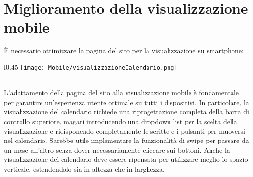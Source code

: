 \section{Miglioramento della visualizzazione mobile}
È necessario ottimizzare la pagina del sito per la visualizzazione su smartphone:
\begin{wrapfigure}{l}{0.45\textwidth}
    \centering
    \texttt{[image: Mobile/visualizzazioneCalendario.png]} 
\end{wrapfigure}
\\
L'adattamento della pagina del sito alla visualizzazione mobile è fondamentale per garantire un'esperienza 
utente ottimale su tutti i dispositivi. In particolare, la visualizzazione del calendario richiede una 
riprogettazione completa della barra di controllo superiore, magari introducendo una dropdown list per 
la scelta della visualizzazione e ridisponendo completamente le scritte e i pulsanti per muoversi nel calendario. 
Sarebbe utile implementare la funzionalità di swipe per passare da un mese all'altro senza dover necessariamente 
cliccare sui bottoni. Anche la visualizzazione del calendario deve essere ripensata per utilizzare meglio lo spazio verticale, 
estendendolo sia in altezza che in larghezza.

